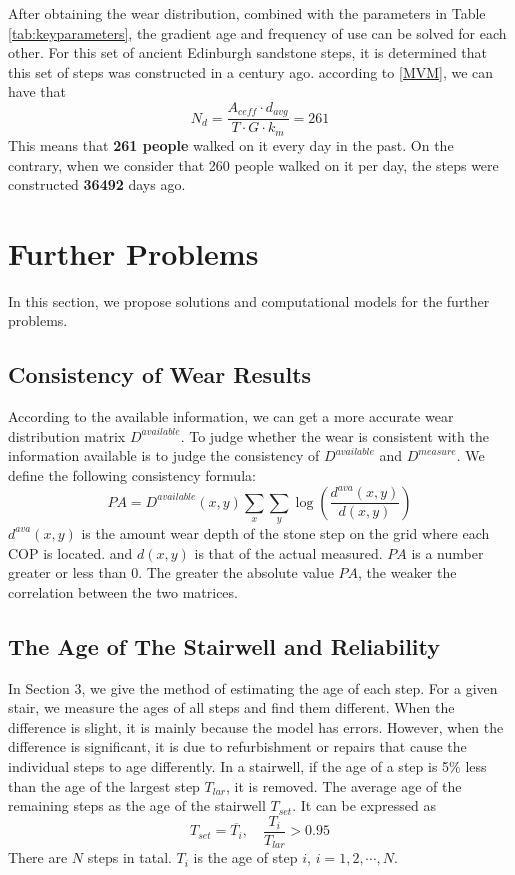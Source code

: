 \documentclass[12pt]{article}  %
\numberwithin{equation}{section} %
\begin{document}
After obtaining the wear distribution, combined with the parameters in Table \ref{tab:keyparameters}, the gradient age and frequency of use can be solved for each other. For this set of ancient Edinburgh sandstone steps, it is determined that this set of steps was constructed in a century ago. according to \autoref{MVM}, we can have that 
\begin{equation}
     N_d = \frac{A_{ceff}\cdot{d_{avg}}}{T\cdot{G}\cdot{k_m}}=261
\end{equation}
 This means that \textbf{261 people} walked on it every day in the past. On the contrary, when we consider that 260 people walked on it per day, the steps were constructed \textbf{36492} days ago.


\section{Further Problems}
In this section, we propose solutions and computational models for the further problems.
\subsection{Consistency of Wear Results}
According to the available information, we can get a more accurate wear distribution matrix $D^{available}$. To judge whether the wear is consistent with the information available is to judge the consistency of $D^{available}$ and $D^{measure}$. We define the following consistency formula:
\begin{equation}
    PA = D^{available}(x, y) \sum_x \sum_y \log \left( \frac{d^{ava}(x, y)}{d(x, y)} \right)
\end{equation}
$d^{ava}(x,y)$ is the amount wear depth of the stone step on the grid where each COP is located. and $d(x,y)$ is that of the actual measured.  $PA$ is a number greater or less than 0. The greater the absolute value $PA$, the weaker the correlation between the two matrices.
\subsection{The Age of The Stairwell and Reliability}
In Section 3, we give the method of estimating the age of each step. For a given stair, we measure the ages of all steps and find them different. When the difference is slight, it is mainly because the model has errors. However, when the difference is significant, it is due to refurbishment or repairs that cause the individual steps to age differently. In a stairwell, if the age of a step is 5\% less than the age of the largest step $T_{lar}$, it is removed. The average age of the remaining steps as the age of the stairwell $T_{set}$. It can be expressed as
\begin{equation}
   T_{set}= \overline{T_i},\quad\frac{T_i}{T_{lar}}>0.95
\end{equation}
There are $N$ steps in tatal. $T_i$ is the age of step $i$, $i=1,2,\cdots,N$. 
\end{document}
